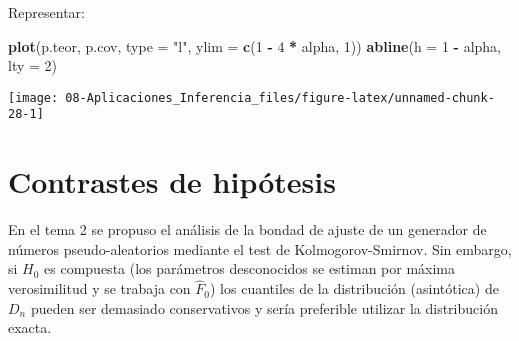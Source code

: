\documentclass[
]{book}
\newenvironment{Shaded}{\begin{snugshade}}{\end{snugshade}}
\newcommand{\DataTypeTok}[1]{\textcolor[rgb]{0.13,0.29,0.53}{#1}}
\newcommand{\DecValTok}[1]{\textcolor[rgb]{0.00,0.00,0.81}{#1}}
\newcommand{\KeywordTok}[1]{\textcolor[rgb]{0.13,0.29,0.53}{\textbf{#1}}}
\newcommand{\NormalTok}[1]{#1}
\newcommand{\OperatorTok}[1]{\textcolor[rgb]{0.81,0.36,0.00}{\textbf{#1}}}
\newcommand{\StringTok}[1]{\textcolor[rgb]{0.31,0.60,0.02}{#1}}
\theoremstyle{break}
\theoremstyle{definition}
\theoremstyle{definition}
\theoremstyle{definition}
\theoremstyle{remark}
\let\BeginKnitrBlock\begin \let\EndKnitrBlock\end
\begin{document}
\begin{enumerate}
  Representar:

\begin{Shaded}
\begin{Highlighting}[]
\KeywordTok{plot}\NormalTok{(p.teor, p.cov, }\DataTypeTok{type =} \StringTok{"l"}\NormalTok{, }\DataTypeTok{ylim =} \KeywordTok{c}\NormalTok{(}\DecValTok{1} \OperatorTok{-}\StringTok{ }\DecValTok{4} \OperatorTok{*}\StringTok{ }\NormalTok{alpha, }\DecValTok{1}\NormalTok{))}
\KeywordTok{abline}\NormalTok{(}\DataTypeTok{h =} \DecValTok{1} \OperatorTok{-}\StringTok{ }\NormalTok{alpha, }\DataTypeTok{lty =} \DecValTok{2}\NormalTok{) }
\end{Highlighting}
\end{Shaded}

  \begin{center}\texttt{[image: 08-Aplicaciones\_Inferencia\_files/figure-latex/unnamed-chunk-28-1]} \end{center}
\end{enumerate}

\hypertarget{contrastes}{%
\section{Contrastes de hipótesis}\label{contrastes}}

\BeginKnitrBlock{exercise}
\protect\hypertarget{exr:ks-test-sim}{}{\label{exr:ks-test-sim} }
\EndKnitrBlock{exercise}

En el tema 2 se propuso el análisis de la bondad de ajuste de un
generador de números pseudo-aleatorios mediante el test de
Kolmogorov-Smirnov. Sin embargo, si \(H_{0}\) es compuesta (los
parámetros desconocidos se estiman por máxima verosimilitud y se
trabaja con \(\hat{F}_{0}\)) los cuantiles de la
distribución (asintótica) de \(D_{n}\) pueden ser demasiado
conservativos y sería preferible utilizar la distribución exacta.
\end{document}
